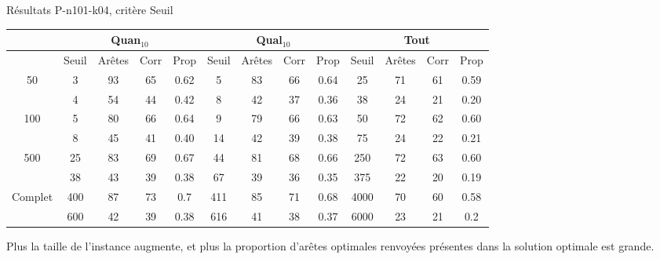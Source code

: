 \documentclass{beamer}
\begin{document}
\begin{frame}{Résultats P-n101-k04, critère Seuil}

\begin{table}[H]
\begin{tabular}{|@{}c@{}|@{}c@{}|@{}c@{}|@{}c@{}|@{}c@{}||@{}c@{}|@{}c@{}|@{}c@{}|@{}c@{}||@{}c@{}|@{}c@{}|@{}c@{}|@{}c@{}|}

\hline
 & \multicolumn{4}{c|}{Quan$_{10}$} & \multicolumn{4}{c|}{Qual$_{10}$} & \multicolumn{4}{c|}{Tout} \\
 \hline
 & Seuil & Arêtes & Corr & Prop & Seuil & Arêtes & Corr & Prop & Seuil & Arêtes & Corr & Prop \\
 \hline
 50 & 3 & 93 & 65 & 0.62 & 5 & 83 & 66 & 0.64 & 25 & 71 & 61 & 0.59 \\
 \cline{2-13} 
    & 4 & 54 & 44 & 0.42 & 8 & 42 & 37 & 0.36 & 38 & 24 & 21 & 0.20  \\
  \hline
   100 & 5 & 80 & 66 & 0.64 & 9 & 79 & 66 & 0.63 & 50 & 72 & 62 & 0.60 \\
 \cline{2-13} 
    & 8 & 45 & 41 & 0.40 & 14 & 42 & 39 & 0.38 & 75 & 24 & 22 & 0.21 \\
  \hline
   500 & 25 & 83 & 69 & 0.67 & 44 & 81 & 68 & 0.66 & 250 & 72 & 63 & 0.60 \\
 \cline{2-13} 
    & 38 & 43 & 39 & 0.38 & 67 & 39 & 36 & 0.35 & 375 & 22 & 20 & 0.19 \\
  \hline
   Complet & 400 & 87 & 73 & 0.7 & 411 & 85 & 71 & 0.68 & 4000 & 70 & 60 & 0.58 \\
 \cline{2-13} 
    & 600 & 42 & 39 & 0.38 & 616 & 41 & 38 & 0.37 & 6000 & 23 & 21 & 0.2 \\
  \hline

\end{tabular}


\end{table}

Plus la taille de l'instance augmente, et plus la proportion d'arêtes optimales  renvoyées présentes dans la solution optimale est grande.

\end{frame}
\end{document}
